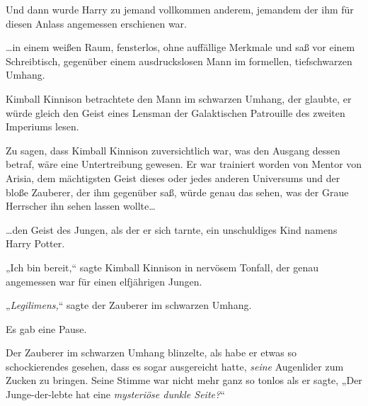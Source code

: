 Und dann wurde Harry zu jemand vollkommen anderem, jemandem der ihm für diesen Anlass angemessen erschienen war.

…in einem weißen Raum, fensterlos, ohne auffällige Merkmale und saß vor einem Schreibtisch, gegenüber einem ausdruckslosen Mann im formellen, tiefschwarzen Umhang.

Kimball Kinnison betrachtete den Mann im schwarzen Umhang, der glaubte, er würde gleich den Geist eines Lensman der Galaktischen Patrouille des zweiten Imperiums lesen.

Zu sagen, dass Kimball Kinnison zuversichtlich war, was den Ausgang dessen betraf, wäre eine Untertreibung gewesen. Er war trainiert worden von Mentor von Arisia, dem mächtigsten Geist dieses oder jedes anderen Universums und der bloße Zauberer, der ihm gegenüber saß, würde genau das sehen, was der Graue Herrscher ihn sehen lassen wollte…

…den Geist des Jungen, als der er sich tarnte, ein unschuldiges Kind namens Harry Potter.

„Ich bin bereit,“ sagte Kimball Kinnison in nervösem Tonfall, der genau angemessen war für einen elfjährigen Jungen.

„\emph{Legilimens,}“ sagte der Zauberer im schwarzen Umhang.

Es gab eine Pause.

Der Zauberer im schwarzen Umhang blinzelte, als habe er etwas so schockierendes gesehen, dass es sogar ausgereicht hatte, \emph{seine} Augenlider zum Zucken zu bringen. Seine Stimme war nicht mehr ganz so tonlos als er sagte, „Der Junge-der-lebte hat eine \emph{mysteriöse dunkle Seite?}“

